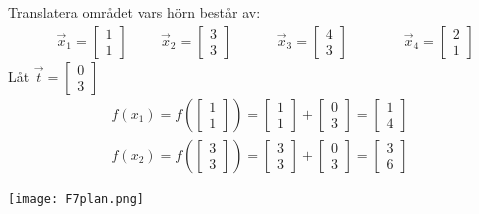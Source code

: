 \begin{Ex}
    Translatera området vars hörn består av:
    \begin{align*}
    &\vec{x}_1 = \begin{bmatrix} 1\\1 \end{bmatrix}
    &&&\vec{x}_2 = \begin{bmatrix} 3\\3 \end{bmatrix}
    &&&&\vec{x}_3 = \begin{bmatrix} 4\\3 \end{bmatrix}
    &&&&&\vec{x}_4 = \begin{bmatrix} 2\\1 \end{bmatrix}
    \end{align*}
    Låt $\vec{t} = \begin{bmatrix} 0\\3 \end{bmatrix}$
    \begin{gather*}
    	f(x_1) = f(\begin{bmatrix} 1\\1 \end{bmatrix}) = \begin{bmatrix} 1\\1 \end{bmatrix} + \begin{bmatrix} 0\\3 \end{bmatrix} = \begin{bmatrix} 1\\4 \end{bmatrix}\\
    	f(x_2) = f(\begin{bmatrix} 3\\3 \end{bmatrix}) = \begin{bmatrix} 3\\3 \end{bmatrix} + \begin{bmatrix} 0\\3 \end{bmatrix} = \begin{bmatrix} 3\\6 \end{bmatrix}
    \end{gather*}
    \begin{center}
    	\texttt{[image: F7plan.png]}
    \end{center}
\end{Ex}
